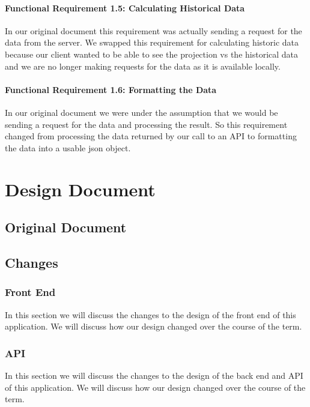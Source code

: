 \documentclass[onecolumn, draftclsnofoot,10pt, compsoc]{article}
\begin{document}
		    \paragraph{Functional Requirement 1.5: Calculating Historical Data}
		    In our original document this requirement was actually sending a request for the data from the server. We swapped this requirement for calculating historic data because our client wanted to be able to see the projection vs the historical data and we are no longer making requests for the data as it is available locally.\\

		    \paragraph{Functional Requirement 1.6: Formatting the Data}
		    In our original document we were under the assumption that we would be sending a request for the data and processing the result. So this requirement changed from processing the data returned by our call to an API to formatting the data into a usable json object.\\

\section{Design Document}
    \subsection{Original Document}
        
        
    \subsection{Changes}
    
        \subsubsection{Front End}
        In this section we will discuss the changes to the design of the front end of this application. We will discuss how our design changed over the course of the term. 
        
        \subsubsection{API}
        In this section we will discuss the changes to the design of the back end and API of this application. We will discuss how our design changed over the course of the term.
        
\end{document}
